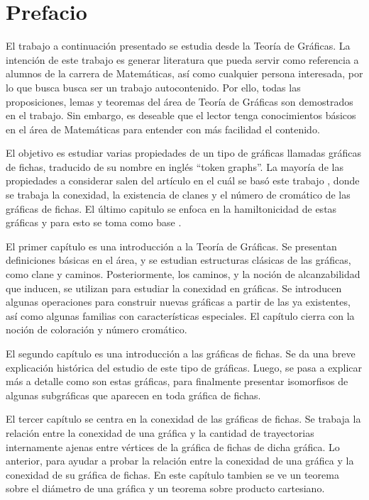 \chapter{Prefacio}
\label{sec:prefacio}

El trabajo a continuaci\'on presentado se estudia desde la Teor\'ia de
Gr\'aficas. La intenci\'on de este trabajo es generar literatura que pueda
servir como referencia a alumnos de la carrera de Matem\'aticas, as\'i como
cualquier persona interesada, por lo que busca busca ser un trabajo
autocontenido. Por ello, todas las proposiciones, lemas y teoremas del \'area de
Teor\'ia de Gr\'aficas son demostrados en el trabajo. Sin embargo, es deseable
que el lector tenga conocimientos b\'asicos en el \'area de Matem\'aticas para
entender con m\'as facilidad el contenido. 

El objetivo es estudiar varias propiedades de un tipo de gr\'aficas llamadas
gr\'aficas de fichas, traducido de su nombre en ingl\'es ``token graphs''. La
mayor\'ia de las propiedades a considerar salen del art\'iculo en el cu\'al se
bas\'o este trabajo \cite{fabilaToken}, donde se trabaja la conexidad, la
existencia de clanes y el n\'umero de crom\'atico de las gr\'aficas de fichas.
El \'ultimo capitulo se enfoca en la hamiltonicidad de estas gr\'aficas y para
esto se toma como base \cite{adameHamilt}. 

El primer cap\'itulo es una introducci\'on a la Teor\'ia de Gr\'aficas.  Se
presentan definiciones b\'asicas en el \'area, y se estudian estructuras
cl\'asicas de las gr\'aficas, como clane y caminos.   Posteriormente, los
caminos, y la noci\'on de alcanzabilidad que inducen, se utilizan para estudiar
la conexidad en gr\'aficas.   Se introducen algunas operaciones para construir
nuevas gr\'aficas a partir de las ya existentes, as\'i como algunas familias con
caracter\'isticas especiales.   El cap\'itulo cierra con la noci\'on de
coloraci\'on y n\'umero crom\'atico.

El segundo cap\'itulo es una introducci\'on a las gr\'aficas de fichas. Se da
una breve explicaci\'on hist\'orica del estudio de este tipo de gr\'aficas.
Luego, se pasa a explicar m\'as a detalle como son estas gr\'aficas, para
finalmente presentar isomorfisos de algunas subgr\'aficas que aparecen en toda
gr\'afica de fichas.

El tercer cap\'itulo se centra en la conexidad de las gr\'aficas de fichas. Se
trabaja la relaci\'on entre la conexidad de una gr\'afica y la cantidad de
trayectorias internamente ajenas entre v\'ertices de la gr\'afica de fichas de
dicha gr\'afica. Lo anterior, para ayudar a probar la relaci\'on entre la
conexidad de una gr\'afica y la conexidad de su gr\'afica de fichas. En este
cap\'itulo tambien se ve un teorema sobre el di\'ametro de una gr\'afica y un
teorema sobre producto cartesiano.


